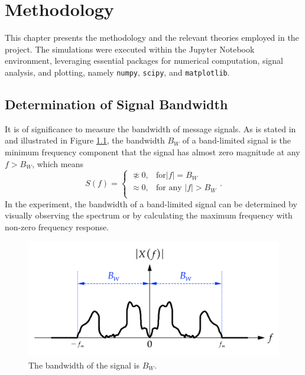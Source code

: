 \documentclass[../ECE459FinalProjectReport.tex]{subfiles}
\begin{document}
\chapter{Methodology}
This chapter presents the methodology and the relevant theories employed in the project. The simulations were executed within the Jupyter Notebook environment, leveraging essential packages for numerical computation, signal analysis, and plotting, namely \verb|numpy|, \verb|scipy|, and \verb|matplotlib|.

\section{Determination of Signal Bandwidth}
It is of significance to measure the bandwidth of message signals. As is stated in \cite[Sec. 7.2.3]{kudekiAnalogSignalsSystems2009} and illustrated in Figure \ref{fig:bw}, the bandwidth $B_W$ of a band-limited signal is the minimum frequency component that the signal has almost zero magnitude at any $f>B_W$, which means
\begin{equation}\label{eq:bw-def}
    S\left( f \right) =
    \begin{cases}
        \napprox 0, & \text{for} \left| f \right|=B_W      \\
        \approx 0,  & \text{for any }\left| f \right| >B_W \\
    \end{cases}.
\end{equation}
In the experiment, the bandwidth of a band-limited signal can be determined by visually observing the spectrum or by calculating the maximum frequency with non-zero frequency response.
\begin{figure}[tb]
    \centering
    \includegraphics[scale=.5]{plots/bw.pdf}
    \caption{The bandwidth of the signal is $B_W$.}
    \label{fig:bw}
\end{figure}
\end{document}
